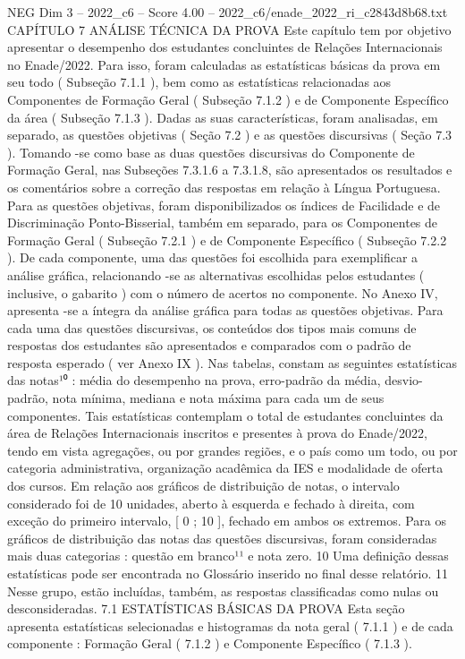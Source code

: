 \begin{textsample}{NEG Dim 3 – 2022\_c6 – Score 4.00 – 2022\_c6/enade\_2022\_ri\_c2843d8b68.txt}  \label{ex:f3_neg_255}
CAPÍTULO 7 ANÁLISE TÉCNICA DA PROVA Este capítulo tem por objetivo apresentar o desempenho dos estudantes concluintes de Relações Internacionais no Enade/2022.
Para isso, foram calculadas as estatísticas básicas da prova em seu todo ( Subseção 7.1.1 ), bem como as estatísticas relacionadas aos Componentes de Formação Geral ( Subseção 7.1.2 ) e de Componente Específico da área ( Subseção 7.1.3 ).
Dadas as suas características, foram analisadas, em separado, as questões objetivas ( Seção 7.2 ) e as questões discursivas ( Seção 7.3 ).
Tomando -se como base as duas questões discursivas do Componente de Formação Geral, nas Subseções 7.3.1.6 a 7.3.1.8, são apresentados os resultados e os comentários sobre a correção das respostas em relação à Língua Portuguesa.
Para as questões objetivas, foram disponibilizados os índices de Facilidade e de Discriminação Ponto-Bisserial, também em separado, para os Componentes de Formação Geral ( Subseção 7.2.1 ) e de Componente Específico ( Subseção 7.2.2 ).
De cada componente, uma das questões foi escolhida para exemplificar a análise gráfica, relacionando -se as alternativas escolhidas pelos estudantes ( inclusive, o gabarito ) com o número de acertos no componente.
No Anexo IV, apresenta -se a íntegra da análise gráfica para todas as questões objetivas.
Para cada uma das questões discursivas, os conteúdos dos tipos mais comuns de respostas dos estudantes são apresentados e comparados com o padrão de resposta esperado ( ver Anexo IX ).
Nas tabelas, constam as seguintes estatísticas das notas¹⁰ : média do desempenho na prova, erro-padrão da média, desvio-padrão, nota mínima, mediana e nota máxima para cada um de seus componentes.
Tais estatísticas contemplam o total de estudantes concluintes da área de Relações Internacionais inscritos e presentes à prova do Enade/2022, tendo em vista agregações, ou por grandes regiões, e o país como um todo, ou por categoria administrativa, organização acadêmica da IES e modalidade de oferta dos cursos.
Em relação aos gráficos de distribuição de notas, o intervalo considerado foi de 10 unidades, aberto à esquerda e fechado à direita, com exceção do primeiro intervalo, [ 0 ; 10 ], fechado em ambos os extremos.
Para os gráficos de distribuição das notas das questões discursivas, foram consideradas mais duas categorias : questão em branco¹¹ e nota zero. 10 Uma definição dessas estatísticas pode ser encontrada no Glossário inserido no final desse relatório. 11 Nesse grupo, estão incluídas, também, as respostas classificadas como nulas ou desconsideradas. 7.1 ESTATÍSTICAS BÁSICAS DA PROVA Esta seção apresenta estatísticas selecionadas e histogramas da nota geral ( 7.1.1 ) e de cada componente : Formação Geral ( 7.1.2 ) e Componente Específico ( 7.1.3 ).

\end{textsample}
